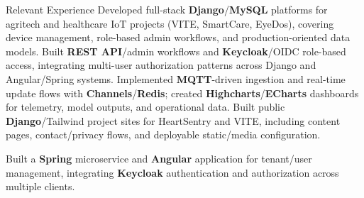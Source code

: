 \begin{rubric}{Relevant Experience}
\entry*%
 Developed full-stack \textbf{Django}/\textbf{MySQL} platforms for agritech and healthcare IoT projects (VITE, SmartCare, EyeDos), covering device management, role-based admin workflows, and production-oriented data models.
\entry*%
 Built \textbf{REST API}/admin workflows and \textbf{Keycloak}/OIDC role-based access, integrating multi-user authorization patterns across Django and Angular/Spring systems.
\entry*%
 Implemented \textbf{MQTT}-driven ingestion and real-time update flows with \textbf{Channels}/\textbf{Redis}; created \textbf{Highcharts}/\textbf{ECharts} dashboards for telemetry, model outputs, and operational data.
\entry*%
 Built public \textbf{Django}/Tailwind project sites for HeartSentry and VITE, including content pages, contact/privacy flows, and deployable static/media configuration.

%
\entry*%
 Built a \textbf{Spring} microservice and \textbf{Angular} application for tenant/user management, integrating \textbf{Keycloak} authentication and authorization across multiple clients.
%
\end{rubric}
